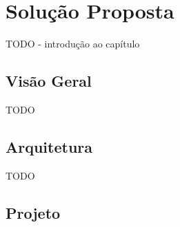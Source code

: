 \chapter{Solução Proposta}
\label{ch:4}

TODO - introdução ao capítulo

\section{Visão Geral}
TODO

\section{Arquitetura}
TODO

\section{Projeto}